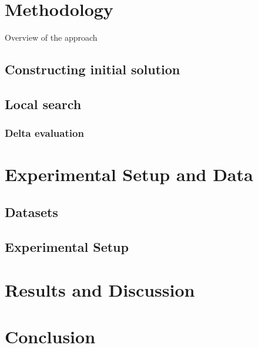 \documentclass[twocolumn, switch]{article} %
\begin{document}
\section{Methodology}
Overview of the approach 

\subsection{Constructing initial solution}
\lipsum[5]

\subsection{Local search}
\lipsum[6]

\subsubsection{Delta evaluation}
\lipsum[7]

\section{Experimental Setup and Data}
\lipsum[8]

\subsection{Datasets}
\lipsum[9]

\subsection{Experimental Setup}
\lipsum[10]

\section{Results and Discussion}
\lipsum[11]

\section{Conclusion}
\lipsum[12] \cite{Cerrone}



\normalsize



\end{document}
